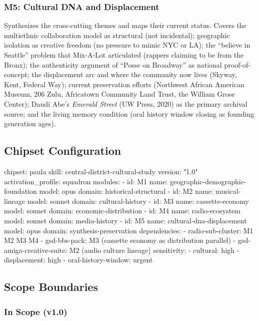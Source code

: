 \documentclass[11pt,letterpaper]{article}
\begin{document}
\subsubsection{M5: Cultural DNA and Displacement}

Synthesizes the cross-cutting themes and maps their current status. Covers the multiethnic collaboration model as structural (not incidental); geographic isolation as creative freedom (no pressure to mimic NYC or LA); the ``believe in Seattle'' problem that Mix-A-Lot articulated (rappers claiming to be from the Bronx); the authenticity argument of ``Posse on Broadway'' as national proof-of-concept; the displacement arc and where the community now lives (Skyway, Kent, Federal Way); current preservation efforts (Northwest African American Museum, 206 Zulu, Africatown Community Land Trust, the William Grose Center); Daudi Abe's \textit{Emerald Street} (UW Press, 2020) as the primary archival source; and the living memory condition (oral history window closing as founding generation ages).

\subsection{Chipset Configuration}

\begin{asciibox}
chipset: paula
skill: central-district-cultural-study
version: "1.0"
activation_profile: squadron
modules:
  - id: M1
    name: geographic-demographic-foundation
    model: opus
    domain: historical-structural
  - id: M2
    name: musical-lineage
    model: sonnet
    domain: cultural-history
  - id: M3
    name: cassette-economy
    model: sonnet
    domain: economic-distribution
  - id: M4
    name: radio-ecosystem
    model: sonnet
    domain: media-history
  - id: M5
    name: cultural-dna-displacement
    model: opus
    domain: synthesis-preservation
dependencies:
  - radio-sub-cluster: M1 M2 M3 M4
  - gsd-bbs-pack: M3 (cassette economy as distribution parallel)
  - gsd-amiga-creative-suite: M2 (audio culture lineage)
sensitivity:
  - cultural: high
  - displacement: high
  - oral-history-window: urgent
\end{asciibox}

\subsection{Scope Boundaries}

\subsubsection{In Scope (v1.0)}
\end{document}
